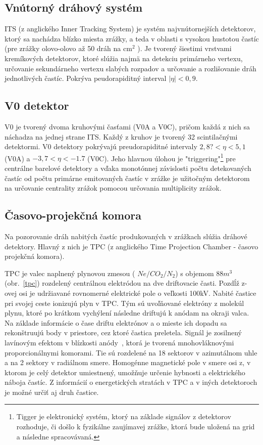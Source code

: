 \documentclass[thesismargins, thesislinespacing]{rnthesis}
\begin{document}
\subsection{Vnútorný dráhový systém}

ITS (z anglického Inner Tracking System) je systém najvnútornejších detektorov, ktorý sa nachádza blízko miesta zrážky, a teda v oblasti s vysokou hustotou častíc (pre zrážky olovo-olovo až 50 dráh na $\mathrm{cm}^2$ ). Je tvorený šiestimi vrstvami kremíkových detektorov, ktoré slúžia najmä na detekciu primárneho vertexu, určovanie sekundárneho vertexu slabých rozpadov a určovanie a rozlišovanie dráh jednotlivých častíc. Pokrýva peudorapiditný interval $|\eta|<0,9$.

\subsection{V0 detektor}

 V0 je tvorený dvoma kruhovými časťami (V0A a V0C), pričom každá z nich sa náchadza na jednej strane ITS. Každý z kruhov je tvorený 32 scintilačnými detektormi. V0 detektory pokrývajú preudorapiditné intervaly $2,8?
 <\eta<5,1$ (V0A) a $-3,7<\eta<-1.7$ (V0C). Jeho hlavnou úlohou je "triggering"\footnote{Tigger je elektronický systém, ktorý na základe signálov z detektorov rozhoduje, či došlo k fyzikálne zaujímavej zrážke, ktorá bude uložená na grid a následne spracovávaná.} pre centrálne barelové detektory a vďaka monotónnej závislosti počtu detekovaných častíc od počtu primárne emitovaných častíc v zrážke je užitočným detektorom na určovanie centrality zrážok pomocou určovania multiplicity zrážok.  

\subsection{Časovo-projekčná komora}
\label{textTPC}
Na pozorovanie dráh nabitých častíc produkovaných v zrážkach slúžia dráhové detektory. Hlavný z nich je TPC (z anglického Time Projection Chamber - časovo projekčná komora).

TPC je valec naplnený plynovou zmesou ( $Ne/CO_2/N_2$) s objemom $88m^3$ (obr.~\ref{tpc}) rozdelený centrálnou elektródou na dve driftovacie časti. Pozdĺž z-ovej osi je udržiavané rovnomerné elektrické pole o veľkosti 100kV. Nabité častice pri svojej ceste ionizujú plyn v TPC. Tým sú uvoľňované elektróny z molekúl plynu, ktoré po krátkom vychýlení následne driftujú k anódam na okraji valca. Na základe informácie o čase driftu elektrónov a o mieste ich dopadu sa rekonštruujú body v priestore, cez ktoré častica preletela. Signál je zosilnený lavínovým efektom v blízkosti anódy~\cite{TPCobr}, ktorá je tvorená mnohovláknovými proporcionálnymi komorami. Tie sú rozdelené na 18 sektorov v azimutálnom uhle a na 2 sektory v radiálnom smere. Homogénne magnetické pole v smere osi z, v ktorom je celý detektor umiestnený, umožňuje určenie hybnosti a elektrického náboja častíc. Z informácií o energetických stratách v TPC a v iných detektoroch je možné určiť aj druh častice. 
\end{document}
